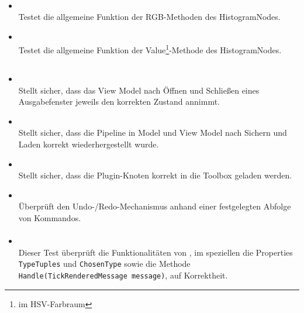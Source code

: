 \paragraph{}
\begin{itemize}
	\item{} \\
		Testet die allgemeine Funktion der RGB-Methoden des HistogramNodes.
	
	\item{} \\
		Testet die allgemeine Funktion der Value\footnote{im HSV-Farbraum}-Methode des HistogramNodes.
\end{itemize}

\subsection{}

\paragraph{}
\begin{itemize}
	\item {} \\
	Stellt sicher, dass das View Model nach Öffnen und Schließen eines Ausgabefenster jeweils den korrekten Zustand annimmt.
	\item {} \\
	Stellt sicher, dass die Pipeline in Model und View Model nach Sichern und Laden korrekt wiederhergestellt wurde.
	\item {} \\
	Stellt sicher, dass die Plugin-Knoten korrekt in die Toolbox geladen werden.
	\item {} \\
	Überprüft den Undo-/Redo-Mechanismus anhand einer festgelegten Abfolge von Kommandos.
\end{itemize}

\paragraph{}

\begin{itemize}

\item{}~\\
Dieser Test überprüft die Funktionalitäten von , im speziellen die Properties \verb#TypeTuples# und \verb#ChosenType# sowie die Methode \verb#Handle(TickRenderedMessage message)#, auf Korrektheit.

\end{itemize}

